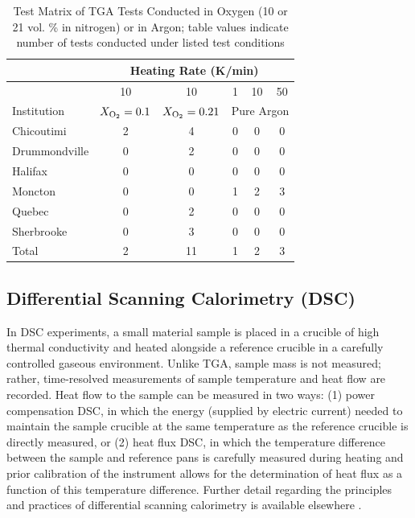 \documentclass{book}
\begin{document}
\begin{table} [h]
\caption{Test Matrix of TGA Tests Conducted in Oxygen (10 or 21 vol. \% in nitrogen) or in Argon; table values indicate number of tests conducted under listed test conditions}
\label{Table:Matrix_TGA_O2_Ar}
\begin{center}
\begin{tabular}{lccccc}
\hline
              & \multicolumn{5}{c}{Heating Rate (K/min)} \\ \hline
              & 10 & 10 & 1 & 10 & 50  \\ %
Institution   & $X_{\rm O_2}=0.1$ & $X_{\rm O_2}=0.21$ & \multicolumn{3}{c}{Pure Argon}  \\ \hline
Chicoutimi    & 2 & 4   & 0 & 0 & 0 \\
Drummondville & 0 & 2   & 0 & 0 & 0 \\
Halifax       & 0 & 0   & 0 & 0 & 0 \\
Moncton       & 0 & 0   & 1 & 2 & 3 \\
Quebec        & 0 & 2   & 0 & 0 & 0 \\
Sherbrooke    & 0 & 3   & 0 & 0 & 0 \\ \hline
Total         & 2 & 11  & 1 & 2 & 3 \\ \hline
\end{tabular}
\end{center}
\end{table}


\subsection{Differential Scanning Calorimetry (DSC)}

In DSC experiments, a small material sample is placed in a crucible of high thermal conductivity and heated alongside a reference crucible in a carefully controlled gaseous environment. Unlike TGA, sample mass is not measured; rather, time-resolved measurements of sample temperature and heat flow are recorded. Heat flow to the sample can be measured in two ways: (1) power compensation DSC, in which the energy (supplied by electric current) needed to maintain the sample crucible at the same temperature as the reference crucible is directly measured, or (2) heat flux DSC, in which the temperature difference between the sample and reference pans is carefully measured during heating and prior calibration of the instrument allows for the determination of heat flux as a function of this temperature difference. Further detail regarding the principles and practices of differential scanning calorimetry is available elsewhere \cite{mcnaughton2003differential}.
\end{document}
